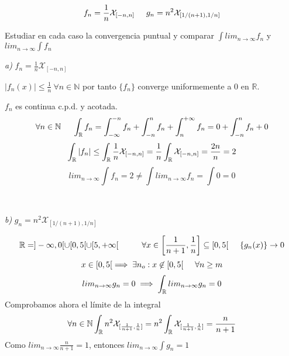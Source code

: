 	\[f_n = \frac{1}{n}\mathcal{X}_{[-n, n]} \hspace{0.5cm} g_n = n^2\mathcal{X}_{[1/(n+1), 1/n]}\]


Estudiar en cada caso la convergencia puntual y comparar $\int lim_{n \rightarrow \infty} f_n$
y $lim_{n \rightarrow \infty} \int f_n$ 

\textit{a)}  $f_n = \frac{1}{n}\mathcal{X}_{[-n, n]}$


$|f_n(x)| \leq \frac{1}{n} \ \forall n\in\mathbb{N}$ por tanto $\{f_n\}$ converge uniformemente a $0$ en $\mathbb{R}$.

$f_n$ es continua c.p.d. y acotada.
\[ \forall n\in \mathbb{N} \hspace{0.5cm} \int_{\mathbb{R}} f_n = 
	\int_{-\infty}^{-n} f_n + \int_{-n}^n f_n + \int_n^{+\infty} f_n = 0 + \int_{-n}^n f_n + 0
\] 
\[ \int_{\mathbb{R}} |f_n| \leq \int_{\mathbb{R}} \frac{1}{n} \mathcal{X}_{[-n, n]} = 
	\frac{1}{n}\int_{\mathbb{R}} \mathcal{X}_{[-n, n]} = \frac{2n}{n} = 2
\]
\[lim_{n\rightarrow \infty} \int f_n = 2 \not = \int lim_{n\rightarrow \infty} f_n = \int 0 = 0\]

{\ }

\textit{b)} $g_n = n^2\mathcal{X}_{[1/(n+1), 1/n]}$

\[\mathbb{R} = ]-\infty, 0[ \cup [0, 5[ \cup [5, +\infty[ \hspace{1cm}
 \forall x\in \left[ \frac{1}{n+1}, \frac{1}{n} \right] \subseteq [0,5[ \hspace{0.5cm} 		
 \{g_n(x)\}\rightarrow 0
\]
\[ x\in[0, 5[ \implies \exists n_o :  x\not\in [0, 5[ \hspace{0.5cm} \forall n\geq m
\]
\[ lim_{n\rightarrow\infty} g_n = 0 \implies \int_{\mathbb{R}} lim_{n\rightarrow\infty} g_n = 0
\]
Comprobamos ahora el límite de la integral
\[ \forall n\in\mathbb{N} \int_{\mathbb{R}} n^2\mathcal{X}_{[\frac{1}{n+1}, \frac{1}{n}]} =
	n^2 \int_{\mathbb{R}}\mathcal{X}_{[\frac{1}{n+1}, \frac{1}{n}]} = \frac{n}{n+1}
\]
Como $lim_{n\rightarrow\infty} \frac{n}{n+1} = 1$, entonces $lim_{n\rightarrow\infty}\int g_n = 1$